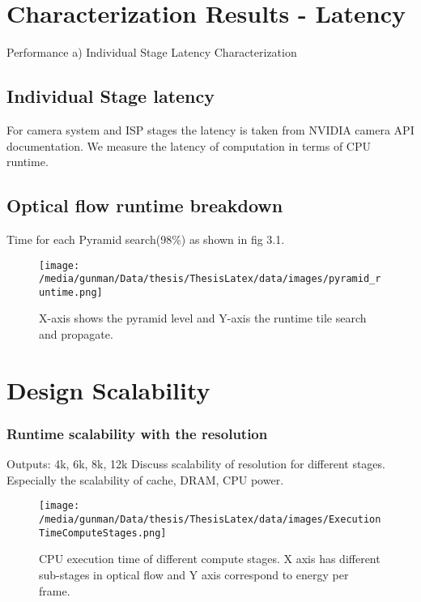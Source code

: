 	
\section{Characterization Results - Latency}

 Performance \newline
	a) Individual Stage Latency Characterization
	

\subsection{Individual Stage latency}
For camera system and ISP stages the latency is taken from NVIDIA camera API documentation. We measure the latency of computation in terms of CPU runtime. 

\subsection{Optical flow runtime breakdown}
Time for each Pyramid search(98\%) as shown in fig 3.1.
\begin{figure*}
	\begin{center}
		\texttt{[image: /media/gunman/Data/thesis/ThesisLatex/data/images/pyramid\_runtime.png]}
		\caption{X-axis shows the pyramid level and Y-axis the runtime tile search and propagate.}
		\label{fig:ex_4_9}
	\end{center}
	\vspace{-0.3in}
\end{figure*} 
	

\section{Design Scalability}	

\subsubsection{Runtime scalability with the resolution}
Outputs:
4k, 6k, 8k, 12k
Discuss scalability of resolution for different stages. \newline
Especially the scalability of cache, DRAM, CPU power. 
\begin{figure*}
	\begin{center}
		\texttt{[image: /media/gunman/Data/thesis/ThesisLatex/data/images/ExecutionTimeComputeStages.png]}
		\caption{CPU execution time of different compute stages. X axis has different sub-stages in optical flow and Y axis correspond to energy per frame.}
		\label{fig:ex_4_9}
	\end{center}
	\vspace{-0.3in}
\end{figure*} 

